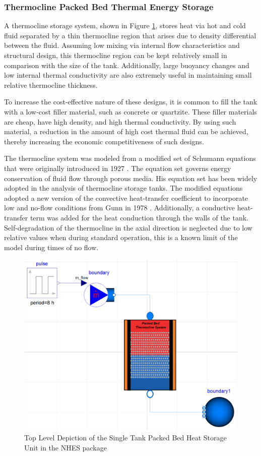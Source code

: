 \subsubsection{Thermocline Packed Bed Thermal Energy Storage}
A thermocline storage system, shown in Figure \ref{Top View Thermocline}, stores heat via hot and cold fluid separated by a thin thermocline region that arises due to density differential between the fluid. Assuming low mixing via internal flow characteristics and structural design, this thermocline region can be kept relatively small in comparison with the size of the tank. Additionally, large buoyancy changes and low internal thermal conductivity are also extremely useful in maintaining small relative thermocline thickness.

To increase the cost-effective nature of these designs, it is common to fill the tank with a low-cost filler material, such as concrete or quartzite. These filler materials are cheap, have high density, and high thermal conductivity. By using such material, a reduction in the amount of high cost thermal fluid can be achieved, thereby increasing the economic competitiveness of such designs.

The thermocline system was modeled from a modified set of Schumann equations that were originally introduced in 1927 \cite{Schumann}. The equation set governs energy conservation of fluid flow through porous media. His equation set has been widely adopted in the analysis of thermocline storage tanks. The modified equations adopted a new version of the convective heat-transfer coefficient to incorporate low and no-flow conditions from Gunn in 1978 \cite{specialHeattransfer}. Additionally, a conductive heat-transfer term was added for the heat conduction through the walls of the tank. Self-degradation of the thermocline in the axial direction is neglected due to low relative values when during standard operation, this is a known limit of the model during times of no flow.

\begin{figure}[hbtp]
\centering
\includegraphics[scale=0.3]{pics/Thermocline_Test.png}
\caption{Top Level Depiction of the Single Tank Packed Bed Heat Storage Unit in the NHES package}
\label{Top View Thermocline}
\end{figure}

%
